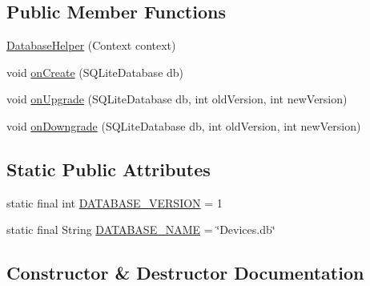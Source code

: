 \subsection*{Public Member Functions}
\begin{DoxyCompactItemize}
\item 
\hyperlink{classandroid_1_1app_1_1printerapp_1_1devices_1_1database_1_1_database_helper_ac902b7455a2ea4581fc73c8bc8d4710b}{Database\+Helper} (Context context)
\item 
void \hyperlink{classandroid_1_1app_1_1printerapp_1_1devices_1_1database_1_1_database_helper_a5cef10c54ec46e77b9a89dcd4f52fa1f}{on\+Create} (S\+Q\+Lite\+Database db)
\item 
void \hyperlink{classandroid_1_1app_1_1printerapp_1_1devices_1_1database_1_1_database_helper_abfcb9f1130f6fc7cd0cce2c966d17856}{on\+Upgrade} (S\+Q\+Lite\+Database db, int old\+Version, int new\+Version)
\item 
void \hyperlink{classandroid_1_1app_1_1printerapp_1_1devices_1_1database_1_1_database_helper_ab850d294476b7a52c18c111b35e91e2a}{on\+Downgrade} (S\+Q\+Lite\+Database db, int old\+Version, int new\+Version)
\end{DoxyCompactItemize}
\subsection*{Static Public Attributes}
\begin{DoxyCompactItemize}
\item 
static final int \hyperlink{classandroid_1_1app_1_1printerapp_1_1devices_1_1database_1_1_database_helper_af216e088e28ca35d44b064e85d9cf065}{D\+A\+T\+A\+B\+A\+S\+E\+\_\+\+V\+E\+R\+S\+I\+ON} = 1
\item 
static final String \hyperlink{classandroid_1_1app_1_1printerapp_1_1devices_1_1database_1_1_database_helper_a31e057632cebe47e813036b9ccd5298d}{D\+A\+T\+A\+B\+A\+S\+E\+\_\+\+N\+A\+ME} = \char`\"{}Devices.\+db\char`\"{}
\end{DoxyCompactItemize}


\subsection{Constructor \& Destructor Documentation}
\mbox{\label{classandroid_1_1app_1_1printerapp_1_1devices_1_1database_1_1_database_helper_ac902b7455a2ea4581fc73c8bc8d4710b}} 
